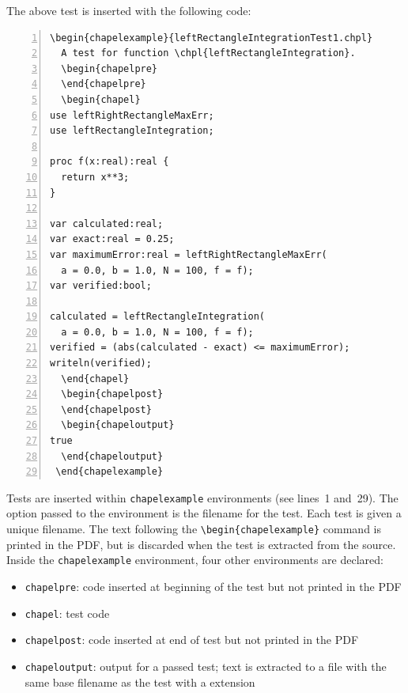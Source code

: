   \begin{seamlessnote}
    The above test is inserted with the following \latex code:
    \begin{Verbatim}[numbers=left]
\begin{chapelexample}{leftRectangleIntegrationTest1.chpl}
  A test for function \chpl{leftRectangleIntegration}.
  \begin{chapelpre}
  \end{chapelpre}
  \begin{chapel}
use leftRightRectangleMaxErr;
use leftRectangleIntegration;

proc f(x:real):real {
  return x**3;
} 

var calculated:real;
var exact:real = 0.25;
var maximumError:real = leftRightRectangleMaxErr(
  a = 0.0, b = 1.0, N = 100, f = f);
var verified:bool;

calculated = leftRectangleIntegration(
  a = 0.0, b = 1.0, N = 100, f = f);
verified = (abs(calculated - exact) <= maximumError);
writeln(verified);
  \end{chapel}
  \begin{chapelpost}
  \end{chapelpost}
  \begin{chapeloutput}
true
  \end{chapeloutput}
 \end{chapelexample}
\end{Verbatim}
    Tests are inserted within \verb|chapelexample| environments (see lines~1 and~29). The option
    passed to the environment is the filename for the test. Each test is given a unique filename.
    The text following the \verb|\begin{chapelexample}| command is printed in the PDF, but is 
      discarded when the test is extracted from the \latex source.  Inside the \verb|chapelexample|
      environment, four other environments are declared: 
      \begin{itemize}
        \item \verb|chapelpre|: code inserted at beginning of the test but not printed in the PDF
        \item \verb|chapel|: test code
        \item \verb|chapelpost|: code inserted at end of test but not printed in the PDF
        \item \verb|chapeloutput|:  output for a passed test; text is extracted to a file
          with the same base filename as the test with a  extension
      \end{itemize}


\end{seamlessnote}
